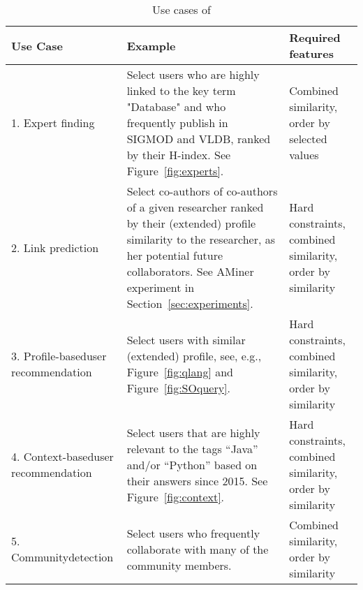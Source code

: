 \begin{table}
	\hspace{-5mm}
	{\scriptsize
		\begin{tabularx}{1.1\columnwidth}{p{}p{}p{}}
			\toprule
			\textbf{Use Case} & \textbf{Example} & \textbf{Required \qlang{}\newline features} \\
			\midrule
			\textsf{1. Expert finding} & Select users who are highly linked to the key term "Database" and who frequently publish in SIGMOD and VLDB, ranked by their H-index. See Figure~\ref{fig:experts}. & Combined similarity, order by selected values\\
			\midrule
			\textsf{2. Link prediction} & Select co-authors of co-authors of a given researcher ranked by their (extended) profile similarity to the researcher, as her potential future collaborators. See AMiner experiment in Section~\ref{sec:experiments}. & Hard constraints, combined similarity, order by similarity\\
			\midrule
			\textsf{3. Profile-based\newline user recommendation} & Select users with similar (extended) profile, see, e.g., Figure~\ref{fig:qlang} and Figure~\ref{fig:SOquery}. & Hard constraints, combined similarity, order by similarity \\
			\midrule
			\textsf{4. Context-based\newline user recommendation} & Select users that are highly relevant to the tags ``Java'' and/or ``Python'' based on their answers since 2015. See Figure~\ref{fig:context}. & Hard constraints, combined similarity, order by similarity \\
			\midrule
			\textsf{5. Community\newline detection} & Select users who frequently collaborate with many of the community members. & Combined similarity, order by similarity\\
			\bottomrule
		\end{tabularx}
	}
	\vspace{-2mm}
	\caption{Use cases of \qlang{}}
	\label{fig:use cases}
	\vspace{-3mm}
\end{table}

